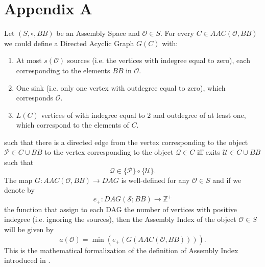 \documentclass[letterpaper,12pt]{article}
\theoremstyle{definition}
\begin{document}
\section*{Appendix A}\label{sec:AppA} 

Let $(S,\circ,BB)$ be an Assembly Space and $\mathscr{O} \in S$. For every $C \in AAC(\mathscr{O},BB)$ we could define a Directed Acyclic Graph $G(C)$ with: 
\begin{enumerate}[(1.)]
    \item At most $s(\mathscr{O})$ sources (i.e. the vertices with indegree equal to zero), each corresponding to the elements $BB$ in $\mathscr{O}$. 
    \item One sink (i.e. only one vertex with outdegree equal to zero), which corresponds $\mathscr{O}$.
    \item $L(C)$ vertices of with indegree equal to $2$ and outdegree of at least one, which correspond to the elements of $C$.
\end{enumerate}
such that there is a directed edge from the vertex corresponding to the object $\mathscr{P} \in C \cup BB$ to the vertex corresponding to the object $\mathscr{Q} \in C$ iff exits $\mathscr{U} \in C \cup BB$ such that
\begin{equation*}
    \mathscr{Q} \in \{\mathscr{P}\} \circ \{\mathscr{U}\}.
\end{equation*}
The map $G: AAC(\mathscr{O},BB) \to DAG$ is well-defined for any $\mathscr{O} \in S$ and if we denote by 
\begin{equation}
    e_+: DAG(\mathcal{S}; BB) \to \mathbb{Z}^+
\end{equation}
the function that assign to each DAG the number of vertices with positive indegree (i.e. ignoring the sources), then the Assembly Index of the object $\mathscr{O} \in S$ will be given by 
\begin{equation}\label{AI}
    a(\mathscr{O}) = \min(e_+(G(AAC(\mathscr{O},BB)))).
\end{equation}
This is the mathematical formalization of the definition of Assembly Index introduced in \cite{Marshall2022FormalisingTP}.

\printbibliography %
\end{document}
